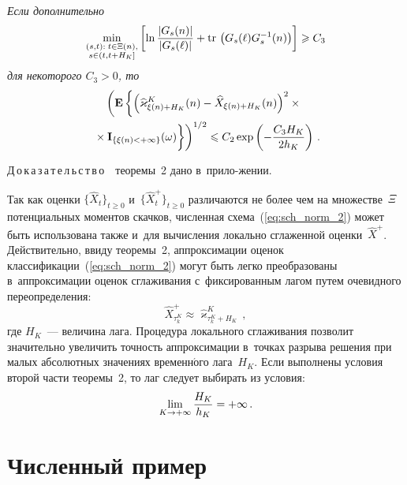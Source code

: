 \begin{multicols}{2}
\pagebreak

  \textit{Если дополнительно}
  \begin{equation*}  %
  \min\limits_{\substack{{(s,t):\; t \in \Xi(n),}\\
{s \in (t, t+H_K]}}}
 \left[ \ln\fr{|G_s(n)|}{|G_s(\ell)|}
+\mathrm{tr}\,
\left(
G_s(\ell)
G_s^{-1}(n)\right)\right] \geqslant C_3
  \end{equation*}
  \textit{для некоторого $C_3>0$,
   то}
    \begin{multline*}
\left(\mathbf{E}\left\{\left(\widehat{\varkappa}^K_{\xi(n) + H_K}(n)-\widehat{X}_{\xi(n) + 
  H_K}(n)\right)^2\times{}\right.\right.\\
 \left. \left.{}\times
  \mathbf{I}_{\{\xi(n)< + \infty\}}(\omega)
  \vphantom{\left(\widehat{\varkappa}^K_{\xi(n) + H_K}(n)-\widehat{X}_{\xi(n) + 
  H_K}(n)\right)^2}
  \right\}
\right)^{1/2} \leqslant  C_2 \exp\left(-{\fr{C_3H_K}{2h_K}} \right)\,.
  \end{multline*}

\noindent
Д\,о\,к\,а\,з\,а\,т\,е\,л\,ь\,с\,т\,в\,о\ \ теоремы~2 дано в~прило-\linebreak жении.

Так как оценки $\{\widehat{X}_t\}_{t \geqslant 0}$ 
и~$\{\widehat{X}_t^+\}_{t \geqslant 0}$
различаются не более чем на множестве~$\Xi$
потенциальных моментов скачков,
численная схема~(\ref{eq:sch_norm_2})
может быть использована также и~для вычисления локально сглаженной 
оценки~$\widehat{X}^+$. Действительно, ввиду тео\-ре\-мы~2,
аппроксимации оценок классификации~(\ref{eq:sch_norm_2})
могут быть легко преобразованы в~аппроксимации оценок сглаживания с~фиксированным 
лагом путем очевидного переопределения:
$$
\widehat{X}_{\tau_k^K}^+ \approx \widehat{\varkappa}_{\tau_k^K+H_K}^K\,,
$$
где $H_K$~--- величина лага. Процедура локального сглаживания позволит значительно 
увеличить точность аппроксимации в~точках разрыва 
решения при малых абсолютных значениях временн$\acute{\mbox{о}}$го лага~$H_K$.
Если выполнены условия второй час\-ти теоремы~2, то лаг следует выбирать из 
условия: 
$$
\lim\limits_{K \to +\infty} \displaystyle\frac{\displaystyle H_K\mathstrut}{\displaystyle h_K\mathstrut}=+\infty\,.
$$


  \section{Численный пример}
  

\end{multicols}
